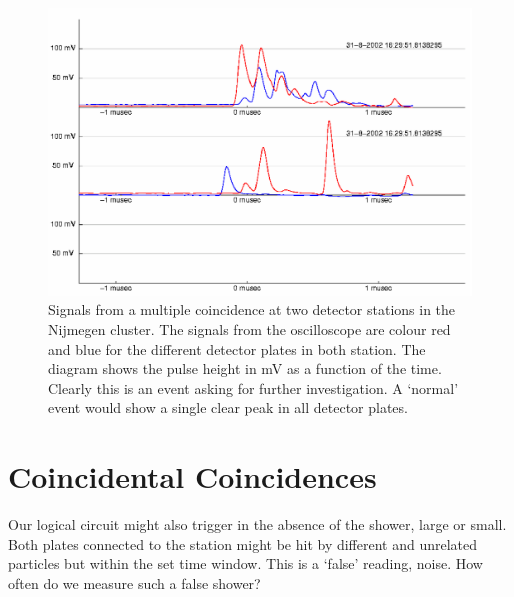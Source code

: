 \documentclass[12pt,a4paper]{article}
\numberwithin{equation}{section}
\numberwithin{figure}{section}
\numberwithin{table}{section}
\begin{document}
\begin{figure}\begin{center}
\includegraphics[scale=0.65]{multiple_coin.eps}
\caption{Signals from a multiple coincidence at two detector stations in the Nijmegen cluster. The signals from the oscilloscope are colour red and blue for the different detector plates in both station. The diagram shows the pulse height in mV as a function of the time. Clearly this is an event asking for further investigation. A `normal' event would show a single clear peak in all detector plates.\protect\footnotemark}\label{fig:multiple_coin}
\end{center}\end{figure}


\section{Coincidental Coincidences}
Our logical circuit might also trigger in the absence of the shower, large or small. Both plates connected to the station might be hit by different and unrelated particles but within the set time window. This is a `false' reading, noise. How often do we measure such a false shower?
\end{document}
